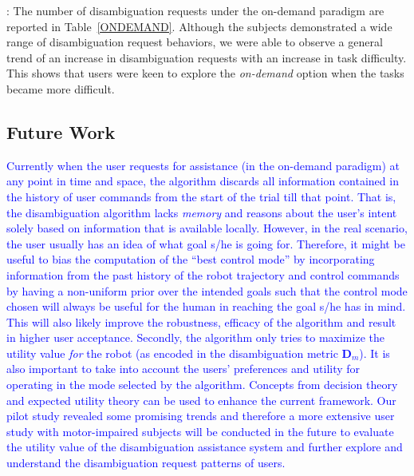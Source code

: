 \documentclass[conference]{IEEEtran}
\begin{document}
\vspace{0.1cm}
: The number of disambiguation requests under the on-demand paradigm are reported in Table~\ref{ONDEMAND}. Although the subjects demonstrated a wide range of disambiguation request behaviors, we were able to observe a general trend of an increase in disambiguation requests with an increase in task difficulty. This shows that users were keen to explore the \textit{on-demand} option when the tasks became more difficult. 

\subsection{Future Work}
\textcolor{blue}{Currently when the user requests for assistance (in the on-demand paradigm) at any point in time and space, the algorithm discards all information contained in the history of user commands from the start of the trial till that point. That is, the disambiguation algorithm lacks \textit{memory} and reasons about the user's intent solely based on information that is available locally. However, in the real scenario, the user usually has an idea of what goal s/he is going for. Therefore, it might be useful to bias the computation of the ``best control mode'' by incorporating information from the past history of the robot trajectory and control commands by having a non-uniform prior over the intended goals such that the control mode chosen will always be useful for the human in reaching the goal s/he has in mind. This will also likely improve the robustness, efficacy of the algorithm and result in higher user acceptance.
Secondly, the algorithm only tries to maximize the utility value \textit{for} the robot (as encoded in the disambiguation metric $\boldsymbol{D}_m$). It is also important to take into account the users' preferences and utility for operating in the mode selected by the algorithm. Concepts from decision theory and expected utility theory can be used to enhance the current framework. Our pilot study revealed some promising trends and therefore a more extensive user study with motor-impaired subjects will be conducted in the future to evaluate the utility value of the disambiguation assistance system and further explore and understand the disambiguation request patterns of users. }
\end{document}
